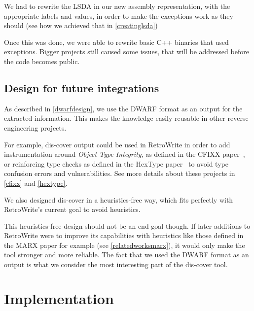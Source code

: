 \documentclass[a4paper,11pt,oneside]{report}
\begin{document}
We had to rewrite the LSDA in our new assembly representation, with the
appropriate labels and values, in order to make the exceptions work as they
should (see how we achieved that in \autoref{creatinglsda})

Once this was done, we were able to rewrite basic C++ binaries that used
exceptions.
Bigger projects still caused some issues, that will be addressed
before the code becomes public.


\section{Design for future integrations}

As described in \autoref{dwarfdesign}, we use the DWARF format as an output
for the extracted information. This makes the knowledge easily reusable in
other reverse engineering projects.

For example, dis-cover output could be used in RetroWrite in order to add
instrumentation around \emph{Object Type Integrity}, as defined in the CFIXX
paper~\cite{cfixx}, or reinforcing type checks as defined in the HexType
paper~\cite{hextype} to avoid type confusion errors and vulnerabilities.
See more details about these projects in \autoref{cfixx} and
\autoref{hextype}.

We also designed dis-cover in a heuristics-free way, which fits perfectly with
RetroWrite's current goal to avoid heuristics.

This heuristics-free design should not be an end goal though.
If later additions to RetroWrite were to improve its capabilities with
heuristics like those defined in the MARX paper for example (see
\autoref{relatedworksmarx}), it would only make the tool stronger and more
reliable.
The fact that we used the DWARF format as an output is what we consider the
most interesting part of the dis-cover tool.


\chapter{Implementation}


\end{document}
